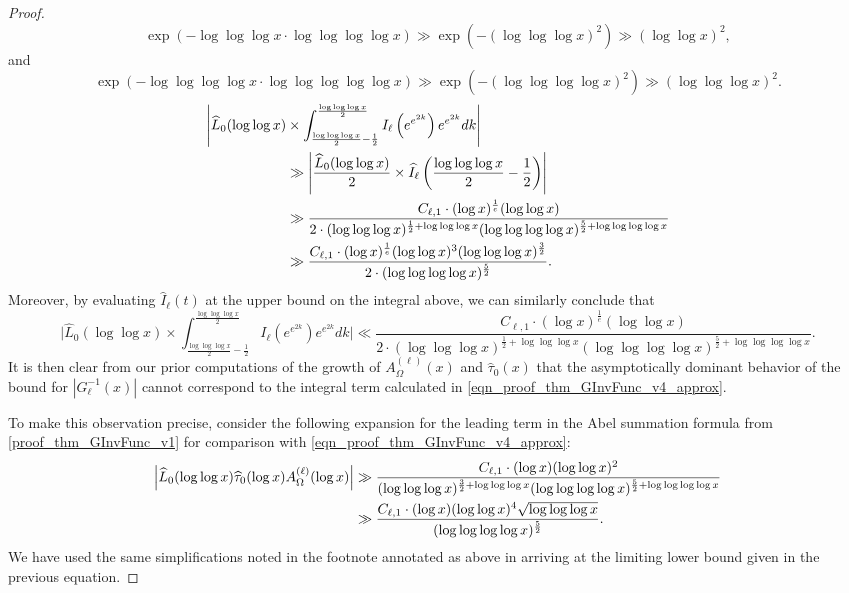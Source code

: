 \documentclass[11pt,reqno,a4letter]{article}
\numberwithin{figure}{section}
\numberwithin{table}{section}
\theoremstyle{plain}
\numberwithin{theorem}{section}
\theoremstyle{definition}
\newcommand{\SuccSim}[0]{\overset{_{\scriptsize{\blacktriangle}}}{\succsim}}
\renewcommand{\SuccSim}[0]{\ensuremath{\gg}}
\begin{document}
\begin{proof}
{     \[
     \exp\left(-\log\log\log x \cdot \log\log\log\log x\right) \SuccSim 
          \exp\left(-(\log\log\log x)^2\right) \SuccSim 
          (\log\log x)^2,  
     \]
     and 
     \[
     \exp\left(-\log\log\log\log x \cdot \log\log\log\log\log x\right) \SuccSim 
          \exp\left(-(\log\log\log\log x)^2\right) \SuccSim 
          (\log\log\log x)^2.  
     \]
} 
\begin{align} 
\notag 
\Biggl\lvert \widehat{L}_0(\log\log x) & 
     \times \int_{\frac{\log\log\log x}{2}-\frac{1}{2}}^{\frac{\log\log\log x}{2}} 
     I_{\ell}\left(e^{e^{2k}}\right) 
     e^{e^{2k}} dk \Biggr\rvert \\ 
\notag 
     & \gg \Biggl\lvert \frac{\widehat{L}_0(\log\log x)}{2} \times  
     \widehat{I}_{\ell}\left(\frac{\log\log\log x}{2}-\frac{1}{2}\right)
     \Biggr\rvert \\ 
\notag 
     & \gg \frac{C_{\ell,1} \cdot (\log x)^{\frac{1}{e}} (\log\log x)}{2 \cdot 
     (\log\log\log x)^{\frac{1}{2} + \log\log\log x} 
     (\log\log\log\log x)^{\frac{5}{2} + \log\log\log\log x}} \\ 
\label{eqn_proof_thm_GInvFunc_v4_approx} 
     & \SuccSim  
     \frac{C_{\ell,1} \cdot (\log x)^{\frac{1}{e}} (\log\log x)^{3} (\log\log\log x)^{\frac{3}{2}}}{ 
     2 \cdot (\log\log\log\log x)^{\frac{5}{2}}}. 
\end{align} 
Moreover, by evaluating $\widehat{I}_{\ell}(t)$ at the upper bound on the integral above, we can 
similarly conclude that 
\[
\Biggl\lvert \widehat{L}_0(\log\log x) 
     \times \int_{\frac{\log\log\log x}{2}-\frac{1}{2}}^{\frac{\log\log\log x}{2}} 
     I_{\ell}\left(e^{e^{2k}}\right) 
     e^{e^{2k}} dk \Biggr\rvert \ll 
     \frac{C_{\ell,1} \cdot (\log x)^{\frac{1}{e}} (\log\log x)}{2 \cdot 
     (\log\log\log x)^{\frac{1}{2} + \log\log\log x} 
     (\log\log\log\log x)^{\frac{5}{2} + \log\log\log\log x}}. 
\]
It is then clear from our prior computations of the growth of 
$A_{\Omega}^{(\ell)}(x)$ and $\widehat{\tau}_0(x)$ 
that the asymptotically dominant behavior of the bound for 
$|G_{\ell}^{-1}(x)|$ cannot correspond to the integral term calculated in 
\eqref{eqn_proof_thm_GInvFunc_v4_approx}. 

To make this observation precise, consider the following expansion for the leading term in 
the Abel summation formula from \eqref{proof_thm_GInvFunc_v1} for comparison with 
\eqref{eqn_proof_thm_GInvFunc_v4_approx}: 
\begin{align} 
\notag 
\left\lvert \widehat{L}_0(\log\log x) \widehat{\tau}_0(\log x) A_{\Omega}^{(\ell)}(\log x) \right\rvert 
\notag 
     & \gg \frac{C_{\ell,1} \cdot (\log x) (\log\log x)^2}{(\log\log\log x)^{\frac{3}{2} + \log\log\log x} 
     (\log\log\log\log x)^{\frac{5}{2} + \log\log\log\log x}} \\ 
\label{eqn_proof_thm_GInvFunc_v5_approx} 
     & \SuccSim 
     \frac{C_{\ell,1} \cdot (\log x) (\log\log x)^{4} \sqrt{\log\log\log x}}{ 
     (\log\log\log\log x)^{\frac{5}{2}}}. 
\end{align} 
We have used the same simplifications noted in the footnote annotated as above in arriving at the 
limiting lower bound given in the previous equation. 
\end{proof} 
\end{document}
